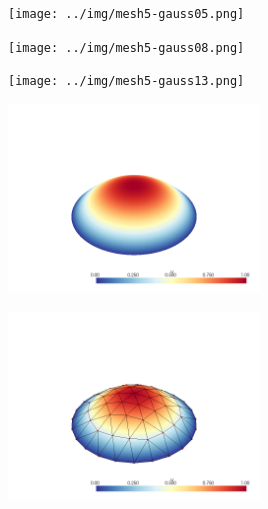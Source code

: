 \documentclass[
  11pt,
]{article}
\let\origfigure\figure
\let\endorigfigure\endfigure
\renewenvironment{figure}[1][2] {
    \expandafter\origfigure\expandafter[H]
} {
    \endorigfigure
}
\begin{document}
\begin{figure}
\centering
\texttt{[image: ../img/mesh5-gauss05.png]}
\caption{Finite element solution for problem 1 over mesh number 5 and
order-5 numerical integration.}
\end{figure}

\begin{figure}
\centering
\texttt{[image: ../img/mesh5-gauss08.png]}
\caption{Finite element solution for problem 1 over mesh number 5 and
order-8 numerical integration.}
\end{figure}

\begin{figure}
\centering
\texttt{[image: ../img/mesh5-gauss13.png]}
\caption{Finite element solution for problem 1 over mesh number 5 and
order-13 numerical integration.}
\end{figure}

\begin{figure}
\centering
\includegraphics[width=0.5\textwidth,height=\textheight]{../img/mesh5-gauss19.png}
\caption{Finite element solution for problem 1 over mesh number 5 and
order-19 numerical integration.}
\end{figure}

\begin{figure}
\centering
\includegraphics[width=0.5\textwidth,height=\textheight]{../img/mesh1-gauss02-b.png}
\caption{Finite element solution for problem 1 over mesh number 1 and
order-2 numerical integration.}
\end{figure}
\end{document}
